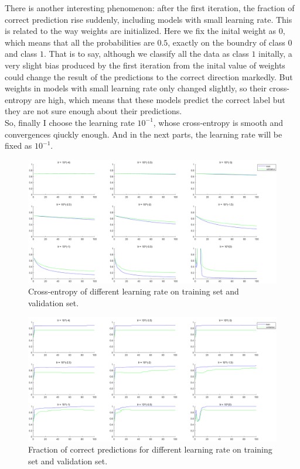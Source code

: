 \documentclass{article}
\begin{document}
There is another interesting phenomenon: after the first iteration, the fraction of correct prediction rise suddenly, including models with small learning rate. This is related to the way weights are initialized. Here we fix the inital weight as $0$, which means that all the probabilities are $0.5$, exactly on the boundry of class $0$ and class $1$. That is to say, although we classify all the data as class $1$ initally, a very slight bias produced by the first iteration from the inital value of weights could change the result of the predictions to the correct direction markedly. But weights in models with small learning rate only changed slightly, so their cross-entropy are high, which means that these models predict the correct label but they are not sure enough about their predictions.\\

So, finally I choose the learning rate $10^{-1}$, whose cross-entropy is smooth and convergences qiuckly enough. And in the next parts, the learning rate will be fixed as $10^{-1}$.

\begin{figure}[H]
	\centering
	\includegraphics[scale=0.4]{figure2}
	\caption{Cross-entropy of different learning rate on training set and validation set.}
	\label{fig2}
\end{figure}

\begin{figure}[H]
	\centering
	\includegraphics[scale=0.4]{figure3}
	\caption{Fraction of correct predictions for different  learning rate on training set and validation set.}
	\label{fig3}
\end{figure}
\end{document}
